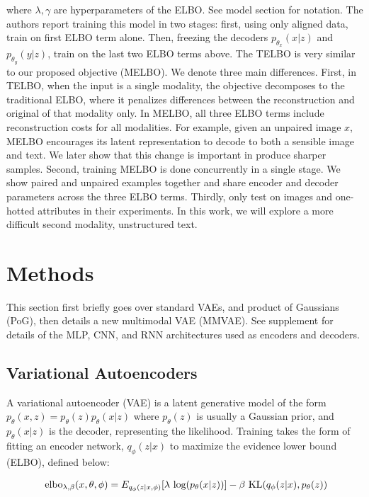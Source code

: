 \documentclass{article}
\begin{document}
where $\lambda, \gamma$ are hyperparameters of the ELBO. See model section for notation. The authors report training this model in two stages: first, using only aligned data, train on first ELBO term alone. Then, freezing the decoders $p_{\theta_{x}}(x|z)$ and $p_{\theta_{y}}(y|z)$, train on the last two ELBO terms above. The TELBO is very similar to our proposed objective (MELBO). We denote three main differences. First, in TELBO, when the input is a single modality, the objective decomposes to the traditional ELBO, where it penalizes differences between the reconstruction and original of that modality only. In MELBO, all three ELBO terms include reconstruction costs for all modalities. For example, given an unpaired image $x$, MELBO encourages its latent representation to decode to both a sensible image and text. We later show that this change is important in produce sharper samples. Second, training MELBO is done concurrently in a single stage. We show paired and unpaired examples together and share encoder and decoder parameters across the three ELBO terms. Thirdly, \citet{vedantam2017generative} only test on images and one-hotted attributes in their experiments. In this work, we will explore a more difficult second modality, unstructured text.  

\section{Methods}
This section first briefly goes over standard VAEs, and product of Gaussians (PoG), then details a new multimodal VAE (MMVAE). See supplement for details of the MLP, CNN, and RNN architectures used as encoders and decoders.

\subsection{Variational Autoencoders}
A variational autoencoder (VAE) \cite{kingma2013auto} is a latent generative model of the form $p_{\theta}(x, z) = p_{\theta}(z)p_{\theta}(x|z)$ where $p_{\theta}(z)$ is usually a Gaussian prior, and $p_{\theta}(x|z)$ is the decoder, representing the likelihood. Training takes the form of fitting an encoder network, $q_{\phi}(z|x)$ to maximize the evidence lower bound (ELBO), defined below:

\begin{equation}\
    \textup{elbo}_{\lambda, \beta}(x, \theta, \phi) = E_{q_{\phi}(z|x, \phi)}[\lambda \textup{ log}(p_{\theta}(x|z))] - \beta \textup{ KL}(q_{\phi}(z|x), p_{\theta}(z))
\end{equation}
\end{document}
